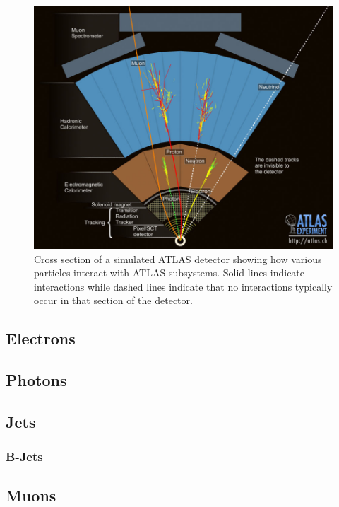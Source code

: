 \begin{figure}[h!]
	\centering
	\includegraphics[width=\columnwidth]{../ThesisImages/Simulation/ParticleInteractions.jpg}
	\caption[Cross section of a simulated ATLAS detector showing how various particles interact with ATLAS subsystems.]{Cross section of a simulated ATLAS detector showing how various particles interact with ATLAS subsystems.  Solid lines indicate interactions while dashed lines indicate that no interactions typically occur in that section of the detector. \cite{ParticleInteractions} 
	}
	\label{fig:ATLASInteractions}
\end{figure}


\subsection{Electrons}
\subsection{Photons}
\subsection{Jets}
\subsubsection{B-Jets}
\label{sec:bjetReco}
\subsection{Muons}
